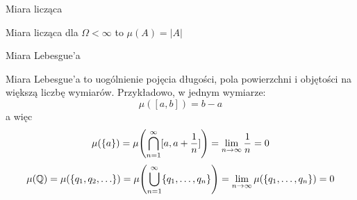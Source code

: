\begin{example}
	Miara licząca
	
	Miara licząca dla \(\Omega < \infty\) to \(\mu(A) = |A|\)
\end{example}

\begin{example} 
	Miara Lebesgue'a
	
	Miara Lebesgue'a to uogólnienie pojęcia długości, pola powierzchni i objętości na większą liczbę wymiarów. Przykładowo, w jednym wymiarze:
	\[
		\mu([a, b]) = b - a
	\]
	a więc
	\[
		\mu(\set{a}) = \mu\pars{\bigcap_{n=1}^\infty [a, a + \frac{1}{n}]} = \lim_{n \to \infty} \frac{1}{n} = 0
	\]
	\[
		\mu(\rational) = \mu(\set{q_1, q_2, \dots}) = \mu\pars{\bigcup_{n=1}^\infty \set{q_1, \dots, q_n}} = \lim_{n \to \infty} \mu(\set{q_1, \dots, q_n}) = 0
	\]
\end{example}
